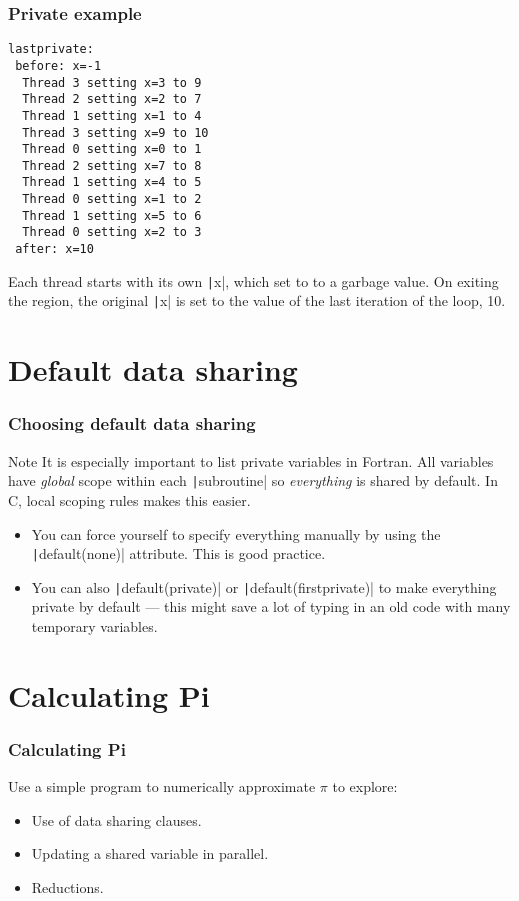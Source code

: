 \documentclass{beamer}
\begin{document}
\begin{frame}[fragile]
\frametitle{Private example}
\begin{verbatim}
lastprivate:
 before: x=-1
  Thread 3 setting x=3 to 9
  Thread 2 setting x=2 to 7
  Thread 1 setting x=1 to 4
  Thread 3 setting x=9 to 10
  Thread 0 setting x=0 to 1
  Thread 2 setting x=7 to 8
  Thread 1 setting x=4 to 5
  Thread 0 setting x=1 to 2
  Thread 1 setting x=5 to 6
  Thread 0 setting x=2 to 3
 after: x=10
\end{verbatim}
Each thread starts with its own \texttt|x|, which set to to a garbage value.
On exiting the region, the original \texttt|x| is set to the value of the last iteration of the loop, 10.
\end{frame}

\section{Default data sharing}
\begin{frame}
\frametitle{Choosing default data sharing}
\begin{alertblock}{Note}
It is especially important to list private variables in Fortran.
All variables have \emph{global} scope within each \texttt|subroutine| so \emph{everything} is shared by default.
In C, local scoping rules makes this easier.
\end{alertblock}

\begin{itemize}
  \item You can force yourself to specify everything manually by using the \texttt|default(none)| attribute. This is good practice.
  \item You can also \texttt|default(private)| or \texttt|default(firstprivate)| to make everything private by default --- this might save a lot of typing in an old code with many temporary variables.
\end{itemize}

\end{frame}

\section{Calculating Pi}
\begin{frame}
\frametitle{Calculating Pi}
Use a simple program to numerically approximate $\pi$ to explore:
\begin{itemize}
  \item Use of data sharing clauses.
  \item Updating a shared variable in parallel.
  \item Reductions.
\end{itemize}
\end{frame}
\end{document}
